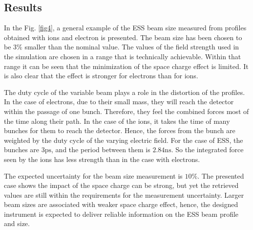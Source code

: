 \begin{refsection}
  \subsection{Results}


  

  In the Fig. \ref{fig4}, a general example of the ESS beam size measured from profiles obtained with ions and electron is presented. The beam size has been chosen to be $3\mathrm{\%}$ smaller than the nominal value. The values of the field strength used in the simulation are chosen in a range that is technically achievable. Within that range it can be seen that the minimization of the space charge effect is limited. It is also clear that the effect is stronger for electrons than for ions.

  The duty cycle of the variable beam plays a role in the distortion of the profiles. In the case of electrons, due to their small mass, they will reach the detector within the passage of one bunch. Therefore, they feel the combined forces most of the time along their path. In the case of the ions, it takes the time of many bunches for them to reach the detector. Hence, the forces from the bunch are weighted by the duty cycle of the varying electric field. For the case of ESS, the bunches are $3\mathrm{ps}$, and the period between them is $2.84\mathrm{ns}$. So the integrated force seen by the ions has less strength than in the case with electrons.

  The expected uncertainty for the beam size measurement is $10\mathrm{\%}$. The presented case shows the impact of the space charge can be strong, but yet the retrieved values are still within the requirements for the measurement uncertainty. Larger beam sizes are associated with weaker space charge effect, hence, the designed instrument is expected to deliver reliable information on the ESS beam profile and size.


\end{refsection}
